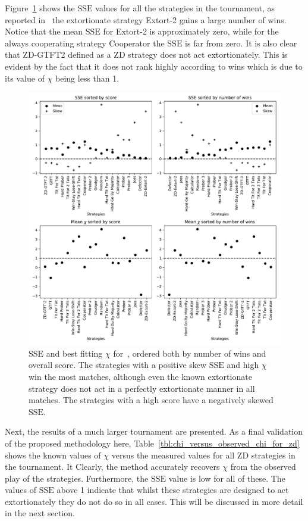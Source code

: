 \documentclass[a4paper]{article}
\newcommand{\SSe}{\text{SSE}}
\begin{document}
Figure~\ref{fig:sserror_in_stewart_plotkin} shows the
\(\SSe\) values for all the strategies in the tournament, as
reported in~\cite{Stewart2012} the extortionate strategy Extort-2 gains a large number of
wins. Notice that the mean \(\SSe\) for Extort-2 is approximately zero, while for
the always cooperating strategy Cooperator the \(\SSe\) is far from zero. It is
also clear that ZD-GTFT2 defined as a ZD strategy does not act
extortionately. This is evident by the fact that it does not rank highly according
to wins which is due to its value of \(\chi\) being less than 1.

\begin{figure}[!htbp]
    \centering
    \includegraphics[width=.8\textwidth]{./assets/img/sserror_in_stewart_plotkin/main.pdf}
    \caption{\(\SSe\) and best fitting \(\chi\) for~\cite{Stewart2012},
        ordered both by number of wins and overall score.
        The strategies with a positive skew
        \(\SSe\) and high \(\chi\) win the most matches, although even the known
        extortionate strategy does not act in a perfectly extortionate manner in
        all matches. The strategies with a high score have a negatively skewed
        \(\SSe\).
        }
    \label{fig:sserror_in_stewart_plotkin}
\end{figure}

Next, the results of a much larger tournament are presented. 
As a final validation of the proposed methodology here,
Table~\ref{tbl:chi_versus_observed_chi_for_zd} shows the known values of
\(\chi\) versus the measured values for all ZD strategies in the tournament. It
Clearly, the method accurately recovers \(\chi\) from the observed play of
the strategies. Furthermore, the \(\SSe\) value is low for all of these. The
values of \(\SSe\) above 1 indicate that whilst these strategies are designed to
act extortionately they do not do so in all cases. This will be discussed in
more detail in the next section.
\end{document}
